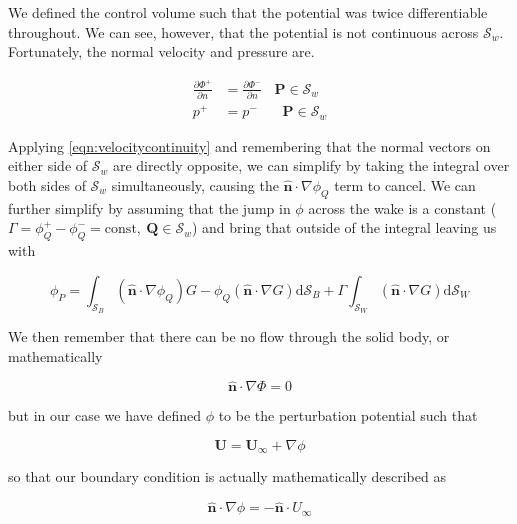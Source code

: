 We defined the control volume such that the potential was twice differentiable throughout. We can see, however, that the potential is not continuous across \( \mathcal{S}_w \). Fortunately, the normal velocity and pressure are.

\begin{align}
\label{eqn:velocitycontinuity}
\frac{\partial \Phi^+}{\partial n} &= \frac{\partial \Phi^-}{\partial n}~~~~\mathbf{P} \in \mathcal{S}_w\\
p^+ &= p^-~~~~~~~~\mathbf{P} \in \mathcal{S}_w
\end{align}

Applying \cref{eqn:velocitycontinuity} and remembering that the normal vectors on either side of \( \mathcal{S}_w \) are directly opposite, we can simplify by taking the integral over both sides of \( \mathcal{S}_w \) simultaneously, causing the \(\mathbf{\hat{n}} \cdot \nabla \phi_Q\) term to cancel.  We can further simplify by assuming that the jump in $\phi$ across the wake is a constant (\( \Gamma = \phi^+_Q - \phi^-_Q = \mathrm{const}, ~\mathbf{Q} \in \mathcal{S}_w \)) and bring that outside of the integral leaving us with

\begin{equation}
\phi_P = \int_{\mathcal{S}_B} \left( \mathbf{\hat{n}} \cdot \nabla \phi_Q \right) G - \phi_Q \left( \mathbf{\hat{n}} \cdot \nabla G \right) \mathrm{d} \mathcal{S}_B + \Gamma \int_{\mathcal{S}_W} \left( \mathbf{\hat{n}} \cdot \nabla G \right) \mathrm{d} \mathcal{S}_W
\end{equation}

We then remember that there can be no flow through the solid body, or mathematically

\begin{equation}
\mathbf{\hat{n}} \cdot \nabla \Phi = 0
\end{equation}

but in our case we have defined $\phi$ to be the perturbation potential such that

\begin{equation}
\mathbf{U} = \mathbf{U_\infty} + \nabla \phi
\end{equation}

so that our boundary condition is actually mathematically described as

\begin{equation}
\mathbf{\hat{n}} \cdot \nabla \phi = -\mathbf{\hat{n}} \cdot U_{\infty}
\end{equation}

